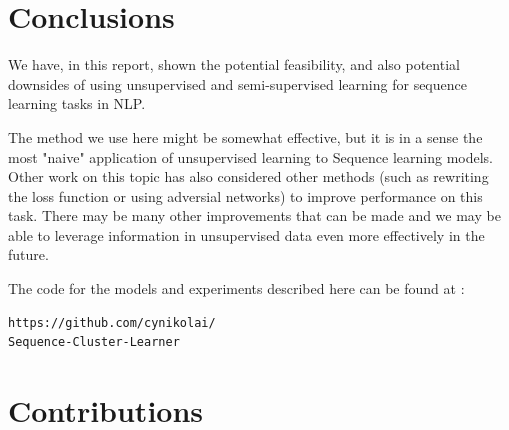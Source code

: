 \documentclass[11pt,letterpaper]{article}
\begin{document}
 
 \clearpage





\section{Conclusions}

We have, in this report, shown the potential feasibility, and also potential downsides of using unsupervised and semi-supervised learning for sequence learning tasks in NLP.

The method we use here might be somewhat effective, but it is in a sense the most "naive" application of unsupervised learning to Sequence learning models. Other work on this topic has also considered other methods (such as rewriting the loss function or using adversial networks) to improve performance on this task. There may be many other improvements that can be made and we may be able to leverage information in unsupervised data even more effectively in the future.

The code for the models and experiments described here can be found at :\begin{verbatim}https://github.com/cynikolai/
Sequence-Cluster-Learner\end{verbatim}

\section{Contributions}












\end{document}

